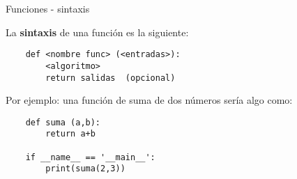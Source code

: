 \begin{frame}[fragile]{Funciones - sintaxis}\vspace{10pt}

La \textbf{sintaxis} de una función es la siguiente:

\begin{center}
\begin{lstlisting}
	def <nombre func> (<entradas>):
		<algoritmo>
		return salidas	(opcional)
\end{lstlisting}
\end{center}

Por ejemplo: una función de suma de dos números sería algo como:

\begin{center}
\begin{lstlisting}
	def suma (a,b):
		return a+b
	
	if __name__ == '__main__':
		print(suma(2,3))
\end{lstlisting}
\end{center}

\end{frame}